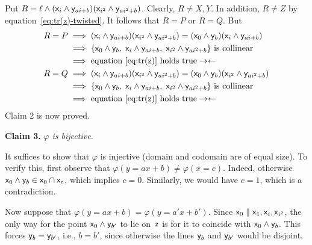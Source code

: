 \begin{solution}
\begin{description}
        Put $R=\ell\wedge(\mathsf x_i\wedge\mathsf y_{ai+b})(\mathsf x_{i^2}\wedge\mathsf y_{ai^2+b})$. Clearly, $R\ne X,Y$. In addition, $R\ne Z$ by equation~\ref{eq:tr(z)-twisted}. It follows that $R=P$ or $R=Q$. But
        \begin{align*}
            R=P&\implies
                (\block x_i\wedge\block y_{ai+b})
                    (\block x_{i^2}\wedge\block y_{ai^2+b})
                    =(\block x_0\wedge\block y_b)
                    (\block x_i\wedge\block y_{ai+b})\\
                &\implies\set{\block x_0\wedge\block y_b,\;
                    \block x_i\wedge\block y_{ai+b},\;
                    \block x_{i^2}\wedge\block y_{ai^2+b}}
                    \text{ is collinear}\\
                &\implies \text{equation \ref{eq:tr(z)} holds true} 
                    \noend\\
            R=Q&\implies
                (\block x_i\wedge\block y_{ai+b})
                    (\block x_{i^2}\wedge\block y_{ai^2+b})
                    =(\block x_0\wedge\block y_b)
                    (\block x_{i^2}\wedge\block y_{ai^2+b})\\
                &\implies\set{\block x_0\wedge\block y_b,\;
                    \block x_i\wedge\block y_{ai+b},\;
                    \block x_{i^2}\wedge\block y_{ai^2+b}}
                    \text{ is collinear}\\
                &\implies \text{equation \ref{eq:tr(z)} holds true} 
                    \noend
        \end{align*}
        Claim 2 is now proved. 

        \medskip

        \textbf{Claim 3.} \textit{$\varphi$ is bijective.}
        
        It suffices to show that $\varphi$ is injective (domain and codomain are of equal size). To verify this, first observe that $\varphi(y=ax+b)\ne\varphi(x=c)$. Indeed, otherwise $\mathsf x_0\wedge\mathsf y_b\in\mathsf x_0\cap\mathsf x_c$, which implies $c=0$. Similarly, we would have $c=1$, which is a contradiction. 

        Now suppose that $\varphi(y=ax+b)=\varphi(y=a'x+b')$. Since $\mathsf x_0 \parallel \mathsf x_1, \mathsf x_i, \mathsf x_{i^2}$, the only way for the point $\mathsf x_0 \wedge \mathsf y_{b'}$ to lie on~$\mathsf z$ is for it to coincide with $\mathsf x_0 \wedge \mathsf y_b$. This forces $\mathsf y_b = \mathsf y_{b'}$, i.e., $b = b'$, since otherwise the lines $\mathsf y_b$ and $\mathsf y_{b'}$ would be disjoint.


\end{description}
\end{solution}
